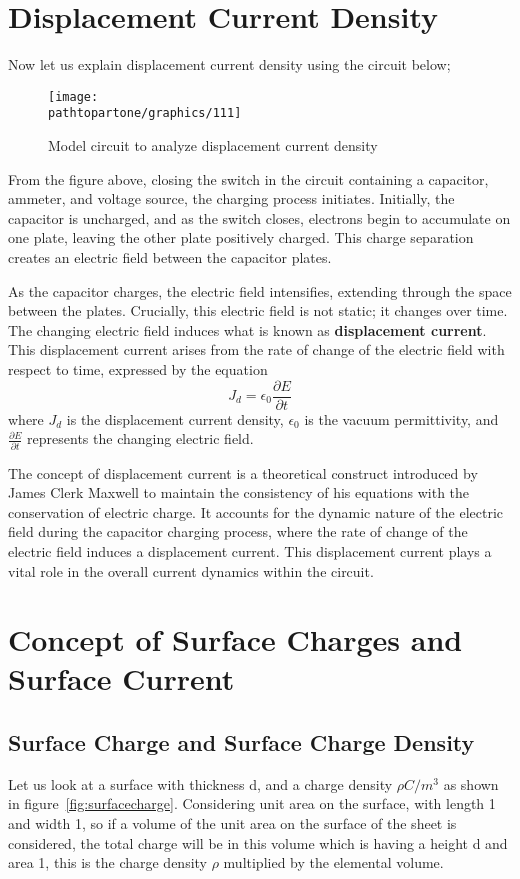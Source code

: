 \section{Displacement Current Density}
Now let us explain displacement current density using the circuit below;

\begin{figure}[h]
\centering
\texttt{[image: \\pathtopartone/graphics/111]}
\caption{Model circuit to analyze displacement current density}
\label{fig:displacement current density}
\end{figure} 
From the figure above, closing the switch in the circuit containing a capacitor, ammeter, and voltage source, the charging process initiates. Initially, the capacitor is uncharged, and as the switch closes, electrons begin to accumulate on one plate, leaving the other plate positively charged. This charge separation creates an electric field between the capacitor plates.

As the capacitor charges, the electric field intensifies, extending through the space between the plates. Crucially, this electric field is not static; it changes over time. The changing electric field induces what is known as \textbf{displacement current}. This displacement current arises from the rate of change of the electric field with respect to time, expressed by the equation
\[
J_d = \epsilon_0 \frac{\partial E}{\partial t}
\]
\begin{equation}\end{equation}
where \(J_d\) is the displacement current density, \(\epsilon_0\) is the vacuum permittivity, and \(\frac{\partial E}{\partial t}\) represents the changing electric field.

The concept of displacement current is a theoretical construct introduced by James Clerk Maxwell to maintain the consistency of his equations with the conservation of electric charge. It accounts for the dynamic nature of the electric field during the capacitor charging process, where the rate of change of the electric field induces a displacement current. This displacement current plays a vital role in the overall current dynamics within the circuit.

\section{Concept of Surface Charges and Surface Current}

\subsection{Surface Charge and Surface Charge Density}
Let us look at a surface with thickness d, and a charge density $\rho$$C/m^{3}$ as shown in figure~\ref{fig:surfacecharge}. Considering unit area on the surface, with length 1 and width 1, so if a volume of the unit area on the surface of the sheet is considered, the total charge will be in this volume which is having a height d and area 1, this is the charge density $\rho$ multiplied by the elemental volume.

